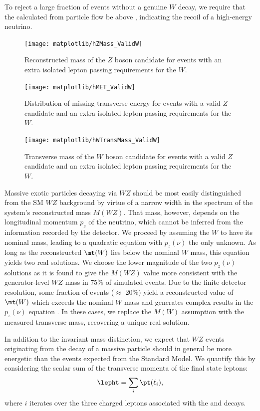 To reject a large fraction of events without a genuine $W$ decay, we require that the \MET calculated from particle flow be above , indicating the recoil of a high-energy neutrino.

\begin{figure}
  \centering
  \texttt{[image: matplotlib/hZMass\_ValidW]}
  \caption{Reconstructed mass of the $Z$ boson candidate for events with an extra isolated lepton passing requirements for the $W$.}
  \label{fig:validw-zmass}
\end{figure}

\begin{figure}
  \centering
  \texttt{[image: matplotlib/hMET\_ValidW]}
  \caption{Distribution of missing transverse energy for events with a valid $Z$ candidate and an extra isolated lepton passing requirements for the $W$.}
  \label{fig:validw-met}
\end{figure}

\begin{figure}
  \centering
  \texttt{[image: matplotlib/hWTransMass\_ValidW]}
  \caption{Transverse mass of the $W$ boson candidate for events with a valid $Z$ candidate and an extra isolated lepton passing requirements for the $W$.}
  \label{fig:validw-transmass}
\end{figure}

Massive exotic particles decaying via $WZ$ should be most easily distinguished from the SM $WZ$ background by virtue of a narrow width in the spectrum of the system's reconstructed mass $M(WZ)$.  That mass, however, depends on the longitudinal momentum $p_z$ of the neutrino, which cannot be inferred from the information recorded by the detector.  We proceed by assuming the $W$ to have its nominal mass, leading to a quadratic equation with $p_z(\nu)$ the only unknown.  As long as the reconstructed $\mt(W)$ lies below the nominal $W$ mass, this equation yields two real solutions.  We choose the lower magnitude of the two $p_z(\nu)$ solutions as it is found to give the $M(WZ)$ value more consistent with the generator-level $WZ$ mass in 75\% of simulated events.  Due to the finite detector resolution, some fraction of events ($\approx$ 20\%) yield a reconstructed value of $\mt(W)$ which exceeds the nominal $W$ mass and generates complex results in the $p_z(\nu)$ equation
.  
In these cases, we replace the $M(W)$ assumption with the measured transverse mass, recovering a unique real solution.

In addition to the invariant mass distinction, we expect that $WZ$ events originating from the decay of a massive particle should in general be more energetic than the events expected from the Standard Model.  We quantify this by considering the scalar sum of the transverse momenta of the final state leptons:
\begin{equation}
  \label{eq:lepht}
  \lepht = \sum_i \pt(\ell_i),
\end{equation}
where $i$ iterates over the three charged leptons associated with the \ztoll and \wtolnu decays.

